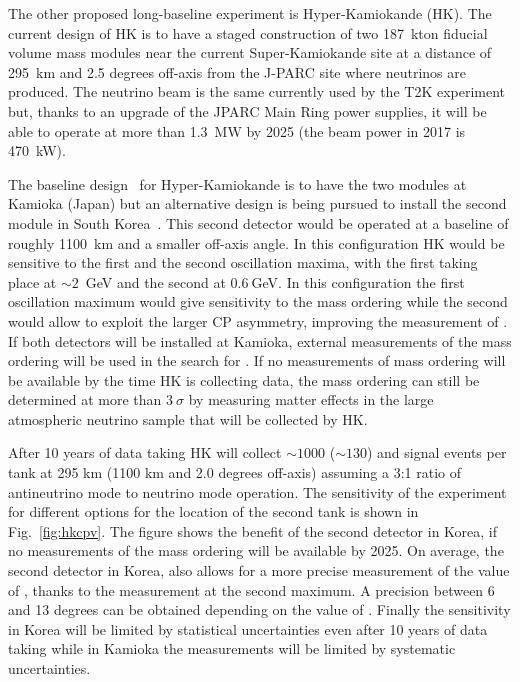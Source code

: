 The other proposed long-baseline experiment is Hyper-Kamiokande (HK). The current design of HK is to have a staged construction of two 187~kton fiducial volume mass modules near the current Super-Kamiokande site at a distance of 295~km and 2.5 degrees off-axis from the J-PARC site where neutrinos are produced. The neutrino beam is the same currently used by the T2K experiment but, thanks to an upgrade of the JPARC Main Ring power supplies, it will be able to operate at more than 1.3~MW  by 2025 (the beam power in 2017 is 470~kW).

The baseline design~\cite{hkdr} for Hyper-Kamiokande is to have the two modules at Kamioka (Japan) but an alternative design is being pursued to install the second module in South Korea~\cite{Abe:2016ero}. This second detector would be operated at a baseline of roughly 1100~km and a smaller off-axis angle. In this configuration HK would be sensitive to the first and the second oscillation maxima, with the first taking place at $\sim2$~GeV and the second at $0.6~$GeV. In this configuration the first oscillation maximum would give sensitivity to the mass ordering while the second would allow to exploit the larger CP asymmetry, improving the measurement of \dcp.  If both detectors will be installed at Kamioka, external measurements of the mass ordering will be used in the search for \dcp. If no measurements of mass ordering will be available by the time HK is collecting data, the mass ordering can still be determined at more than $3~\sigma$ by measuring matter effects in the large atmospheric neutrino sample that will be collected by HK.    

After 10 years of data taking  HK will collect $\sim1000$ ($\sim130$) \nue and \nueb signal events per tank at 295 km (1100 km and 2.0 degrees off-axis) assuming a 3:1 ratio of antineutrino mode to neutrino mode operation. The sensitivity of the experiment for different options for the location of the second tank is shown in Fig.~\ref{fig:hkcpv}. The figure shows the benefit of the second detector in Korea, if no measurements of the mass ordering will be available by 2025. On average, the second detector in Korea, also allows for a more precise measurement of the value of \dcp, thanks to the measurement at the second maximum. A precision between 6 and 13 degrees can be obtained depending on the value of \dcp. Finally the sensitivity in Korea will be limited by statistical uncertainties even after 10 years of data taking while in Kamioka the measurements will be limited by systematic uncertainties.

